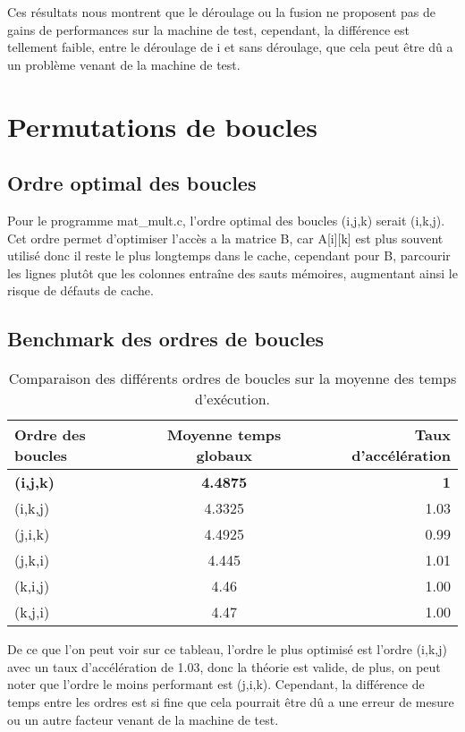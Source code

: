 \documentclass{rapport}
\begin{document}
Ces résultats nous montrent que le déroulage ou la fusion ne proposent pas de gains de performances sur la machine de test, cependant, la différence est tellement faible, entre le déroulage de i et sans déroulage, que cela peut être dû a un problème venant de la machine de test.

\section{Permutations de boucles}
\subsection{Ordre optimal des boucles}
Pour le programme mat\_mult.c, l'ordre optimal des boucles (i,j,k) serait (i,k,j).\newline
Cet ordre permet d'optimiser l'accès a la matrice B, car A[i][k] est plus souvent utilisé donc il reste le plus longtemps dans le cache, 
cependant pour B, parcourir les lignes plutôt que les colonnes entraîne des sauts mémoires, augmentant ainsi le risque de défauts de cache.

\subsection{Benchmark des ordres de boucles}

\begin{table}[H]
  \centering
  \begin{tabular}{ l|c|r }
  Ordre des boucles & Moyenne temps globaux & Taux d'accélération \\
  \hline
  \textbf{(i,j,k)} & \textbf{ 4.4875 } & \textbf{1} \\
  (i,k,j) & 4.3325 & 1.03 \\
  (j,i,k) & 4.4925 & 0.99 \\
  (j,k,i) & 4.445 & 1.01 \\
  (k,i,j) & 4.46 & 1.00 \\
  (k,j,i) & 4.47 & 1.00 \\
  \end{tabular}
  \caption{Comparaison des différents ordres de boucles sur la moyenne des temps d'exécution.}
\end{table}

De ce que l'on peut voir sur ce tableau, l'ordre le plus optimisé est l'ordre (i,k,j) avec un taux d'accélération de 1.03, donc la théorie est valide,
de plus, on peut noter que l'ordre le moins performant est (j,i,k).\newline
Cependant, la différence de temps entre les ordres est si fine que cela pourrait être dû a une erreur de mesure ou un autre facteur venant de la machine de test.
\end{document}
